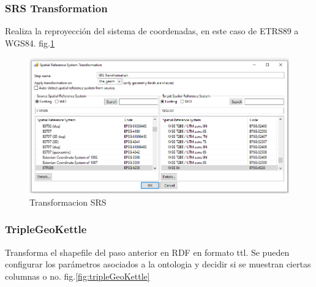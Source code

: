 \subsubsection{SRS Transformation}
Realiza la reproyección del sistema de coordenadas, en este caso de ETRS89 a WGS84. fig.\ref{fig:SRS}

\begin{figure}[H]
    \includegraphics[width=\textwidth]{images/SRS.png}
    \centering
    \caption{Transformacion SRS}
    \label{fig:SRS}
\end{figure}

\subsubsection{TripleGeoKettle}
Transforma el shapefile del paso anterior en RDF en formato ttl. Se pueden configurar los parámetros asociados a la
ontologia y decidir si se muestran ciertas columnas o no. fig.\ref{fig:tripleGeoKettle}


